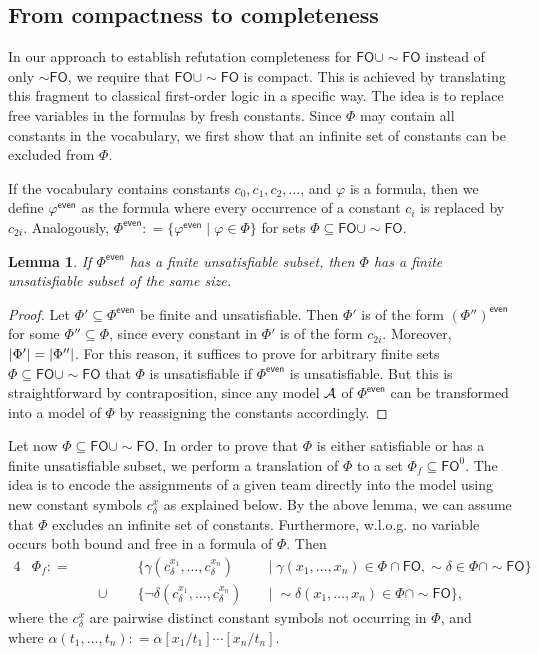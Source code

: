 \documentclass[a4paper,english,fleqn,11pt,final]{scrartcl}
\makeatletter
\newcommand{\wloss}{w.l.o.g.\@\xspace}
\newcommand{\size}[1]{{\protect\ensuremath{\vert\nobreak#1\nobreak\vert}}}
\newcommand{\negg}{{\sim}}
\newcommand{\logic}[1]{\ensuremath{\mathsf{#1}}\xspace}
\newcommand{\FO}{\logic{FO}}
\newcommand{\calA}{\protect\ensuremath{\mathcal{A}}}
\providecommand{\dfn}{\mathrel{\mathop:}=}
\theoremstyle{plain}
\newtheorem{lemma}[theorem]{Lemma}
\theoremstyle{definition}
\makeatother
\begin{document}
\subsection{From compactness to completeness}


In our approach to establish refutation completeness for $\FO\cup\negg\FO$ instead of only $\negg \FO$, we require that $\FO \cup \negg\FO$ is compact.
This is achieved by translating this fragment to classical first-order logic in a specific way.
The idea is to replace free variables in the formulas by fresh constants.
Since $\Phi$ may contain all constants in the vocabulary, we first show that an infinite set of constants can be excluded from $\Phi$.

If the vocabulary contains constants $c_0,c_1,c_2,\ldots$, and $\varphi$ is a formula, then we define $\varphi^\mathsf{even}$ as the formula where every occurrence of a constant $c_i$ is replaced by $c_{2i}$.
Analogously, $\Phi^\mathsf{even} \dfn \{ \varphi^\mathsf{even} \mid \varphi \in \Phi \}$ for sets $\Phi \subseteq \FO\cup \negg\FO$.

\begin{lemma}
If $\Phi^\mathsf{even}$ has a finite unsatisfiable subset, then $\Phi$ has a finite unsatisfiable subset of the same size.
\end{lemma}
\begin{proof}
Let $\Phi' \subseteq \Phi^\mathsf{even}$ be finite and unsatisfiable.
Then $\Phi'$ is of the form $(\Phi'')^\mathsf{even}$ for some $\Phi'' \subseteq \Phi$, since every constant in $\Phi'$ is of the form $c_{2i}$.
Moreover, $\size{\Phi'} = \size{\Phi''}$.
For this reason, it suffices to prove for arbitrary finite sets $\Phi \subseteq \FO\cup \negg\FO$ that $\Phi$ is unsatisfiable if $\Phi^\mathsf{even}$ is unsatisfiable.
But this is straightforward by contraposition, since any model $\calA$ of $\Phi^\mathsf{even}$ can be transformed into a model of $\Phi$ by reassigning the constants accordingly.
\end{proof}

\smallskip

Let now $\Phi \subseteq \FO \cup \negg\FO$.
In order to prove that $\Phi$ is either satisfiable or has a finite unsatisfiable subset, we perform a translation of $\Phi$ to a set $\Phi_f \subseteq \FO^0$.
The idea is to encode the assignments of a given team directly into the model using new constant symbols $c^x_\delta$ as explained below.
By the above lemma, we can assume that $\Phi$ excludes an infinite set of constants.
Furthermore, \wloss no variable occurs both bound and free in a formula of $\Phi$.
Then
\begin{alignat*}{4}
&\Phi_f \dfn&& &&\;\{ \gamma(c^{x_1}_\delta, \ldots, c^{x_n}_\delta) &&\;|\; \gamma(x_1, \ldots, x_n) \in \Phi\cap\FO, \negg\delta \in \Phi\cap\negg\FO\}\\
& &&\;\cup \; &&\; \{ \neg\delta(c^{x_1}_\delta, \ldots, c^{x_n}_\delta) &&\;| \;\negg\delta(x_1, \ldots, x_n) \in \Phi\cap\negg\FO\}\text{,}
\end{alignat*}
where the $c^x_\delta$ are pairwise distinct constant symbols not occurring in $\Phi$, and where $\alpha(t_1, \ldots, t_n) \dfn \alpha[x_1/t_1]\cdots[x_n/t_n]$.
\end{document}
